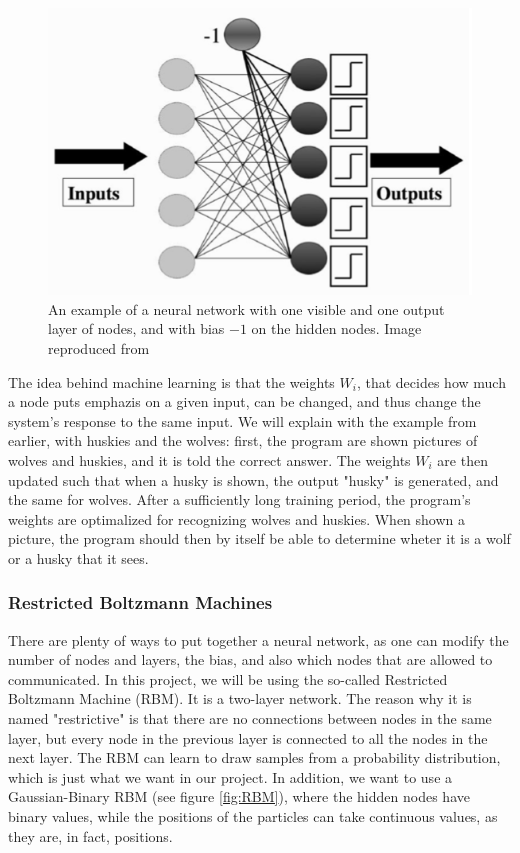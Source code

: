 \documentclass[norsk,a4paper,12pt]{article}
\begin{document}
 \begin{figure} [H]
	\centering
	\includegraphics[scale=0.5]{plots/neural_network.png}
	\caption{An example of a neural network with one visible and one output layer of nodes, and with bias $-1$ on the hidden nodes. Image reproduced from \cite{Marsland} }
	\label{fig:neural_network}
\end{figure}

The idea behind machine learning is that the weights $W_i$, that decides how much a node puts emphazis on a given input, can be changed, and thus change the system's response to the same input. We will explain with the example from earlier, with huskies and the wolves: first, the program are shown pictures of wolves and huskies, and it is told the correct answer. The weights $W_i$ are then updated such that when a husky is shown, the output "husky" is generated, and the same for wolves. After a sufficiently long training period, the program's weights are optimalized for recognizing wolves and huskies. When shown a picture, the program should then by itself be able to determine wheter it is a wolf or a husky that it sees. 

\subsubsection{Restricted Boltzmann Machines} \label{sec:RBM}
There are plenty of ways to put together a neural network, as one can modify the number of nodes and layers, the bias, and also which nodes that are allowed to communicated. In this project, we will be using the so-called Restricted Boltzmann Machine (RBM). It is a two-layer network. The reason why it is named "restrictive" is that there are no connections between nodes in the same layer, but every node in the previous layer is connected to all the nodes in the next layer. The RBM can learn to draw samples from a probability distribution, which is just what we want in our project. In addition, we want to use a Gaussian-Binary RBM (see figure \ref{fig:RBM}), where the hidden nodes have binary values, while the positions of the particles can take continuous values, as they are, in fact, positions. 
\end{document}
